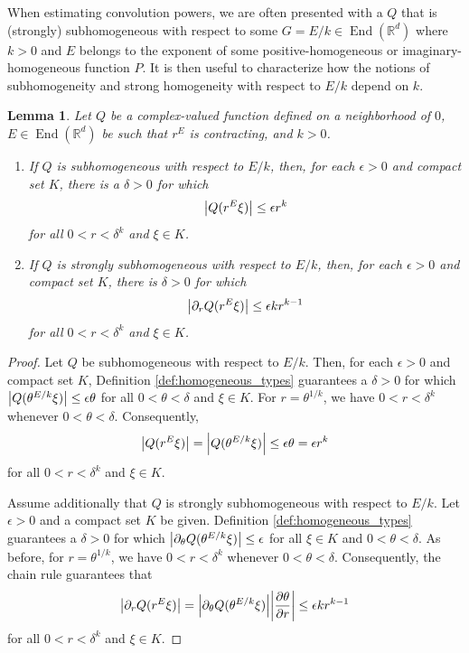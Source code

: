 \documentclass[11pt, letter]{book}
\newtheorem{lemma}[theorem]{Lemma}
\newcommand\End{\operatorname{End}} %
\newcommand{\p}{\partial}
\newcommand{\f}[2]{\frac{#1}{#2}}
\begin{document}
\noindent  When estimating convolution powers, we are often presented with a $Q$ that is (strongly) subhomogeneous with respect to some $G = E/k \in \End{(\mathbb{R}^d)}$ where $k>0$ and $E$ belongs to the exponent of some positive-homogeneous or imaginary-homogeneous function $P$. It is then useful to characterize how the notions of subhomogeneity and strong homogeneity with respect to $E/k$ depend on $k$.
\begin{framed}
\begin{lemma}\label{lem:ScalingofSubHomogeneous}
Let $Q$ be a complex-valued function defined on a neighborhood of $0$, $E\in\End(\mathbb{R}^d)$ be such that $r^E$ is contracting, and $k>0$.
\begin{enumerate}
\item If $Q$ is subhomogeneous with respect to $E/k$, then, for each $\epsilon>0$ and compact set $K$, there is a $\delta>0$ for which 
\begin{equation*}
\abs{Q(r^{E}\xi)}\leq \epsilon r^k
\end{equation*}
for all $0<r<\delta^k$ and $\xi\in K$.
\item If $Q$ is strongly subhomogeneous with respect to $E/k$, then, for each $\epsilon>0$ and compact set $K$, there is $\delta>0$ for which
\begin{equation*}
\abs{\partial_r Q(r^E\xi)}\leq \epsilon k  r^{k-1}
\end{equation*}
for all $0<r<\delta^k$ and $\xi\in K$.
\end{enumerate}
\end{lemma}
\end{framed}
\begin{proof}
Let $Q$ be subhomogeneous with respect to $E/k$. Then, for each $\epsilon > 0$ and compact set $K$, Definition \ref{def:homogeneous_types} guarantees a $\delta> 0$ for which 
$\abs{Q(\theta^{E/k} \xi)} \leq \epsilon \theta$ for all $0 < \theta < \delta$ and $\xi \in K$. For $r = \theta^{1/k}$, we have $0<r<\delta^k$ whenever $0<\theta<\delta$. Consequently,
\begin{equation*}
    \abs{Q(r^E \xi)} =\abs{Q(\theta^{E/k}\xi)} \leq \epsilon \theta= \epsilon r^k
\end{equation*}
for all $0 < r < \delta^k$ and $\xi \in K$. 

Assume additionally that $Q$ is strongly subhomogeneous with respect to $E/k$. Let $\epsilon > 0$ and a compact set $K$ be given. Definition \ref{def:homogeneous_types} guarantees a $\delta> 0$ for which $\abs{\p_\theta Q(\theta^{E/k} \xi)} \leq \epsilon$ for all $\xi \in K$ and $0 < \theta < \delta$. As before, for $r = \theta^{1/k}$, we have $0<r<\delta^k$ whenever $0<\theta<\delta$. Consequently, the chain rule guarantees that
\begin{equation*}
    \abs{\p_r Q(r^{E} \xi)} = \abs{\p_\theta Q(\theta^{E/k} \xi)} 
    \abs{\f{\p \theta}{\p r}} \leq \epsilon k  r^{k-1}
\end{equation*}
for all $0 < r < \delta^k$ and $\xi \in K$. 
\end{proof}
\end{document}
